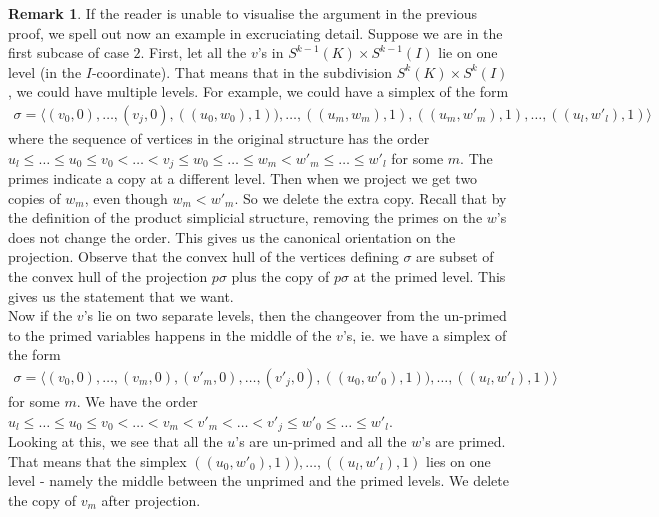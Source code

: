 \documentclass[a4paper,11pt]{article}
\theoremstyle{definition}
\newtheorem*{remark}{Remark}
\theoremstyle{plain}
\theoremstyle{remark}
\begin{document}
\begin{remark}If the reader is unable to visualise the argument in the previous proof, we spell out now an example in excruciating detail. Suppose we are in the first subcase of case $2$. First, let all the $v$'s in $S^{k-1}(K) \times S^{k-1}(I)$ lie on one level (in the $I$-coordinate). That means that in the subdivision $S^{k}(K) \times S^{k}(I)$, we could have multiple levels. For example, we could have a simplex of the form 
 \begin{align*}
\sigma = \langle (v_0,0),\dots,(v_{j},0), ((u_0,w_0),1)), \dots,  ((u_m,w_m),1),  ((u_m,w'_m),1), \dots, ((u_l,w'_l),1)\rangle
\end{align*}
where the sequence of vertices in the original structure has the order  $u_{l}\leq \dots \leq u_{0} \leq v_{0} <\dots< v_{j} \leq w_{0}\leq \dots  \leq w_m< w'_{m}\leq \dots \leq w'_{l}$ for some $m$. The primes indicate a copy at a different level. Then when we project we get two copies of $w_{m}$, even though $w_{m}<w'_{m}$. So we delete the extra copy. Recall that by the definition of the product simplicial structure, removing the primes on the $w$'s does not change the order. This gives us the canonical orientation on the projection. Observe that the convex hull of the vertices defining $\sigma$ are subset of the convex hull of the projection $p\sigma$ plus the copy of $p\sigma$ at the primed level. This gives us the statement that we want. \\

Now if the $v$'s lie on two separate levels, then the changeover from the un-primed to the primed variables happens in the middle of the $v$'s, ie. we have a simplex of the form 
 \begin{align*}
\sigma = \langle (v_0,0),\dots,(v_{m},0), (v'_{m},0),\dots, (v'_{j},0), ((u_0,w'_0),1)), \dots, ((u_l,w'_l),1) \rangle
\end{align*}
for some $m$. We have the order $u_{l}\leq \dots \leq u_{0} \leq v_{0} <\dots<v_{m}<v'_m <\dots< v'_{j} \leq w'_{0} \leq \dots \leq w'_{l}$.  \\

Looking at this, we see that all the $u$'s are un-primed and all the $w$'s are primed. That means that the simplex $((u_0,w'_0),1)), \dots, ((u_l,w'_l),1)$ lies on one level - namely the middle between the unprimed and the primed levels. We delete the copy of $v_{m}$ after projection. 
\end{remark}
\end{document}
